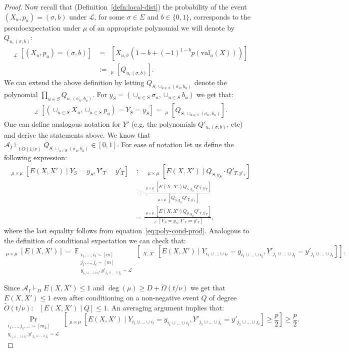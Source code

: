 \documentclass[11pt]{article}
\DeclareMathOperator*{\E}{\mathbb{E}}
\DeclareMathOperator*{\pE}{\widetilde{\mathbb{E}}}
\DeclareMathOperator*{\pPr}{\widetilde{\Pr}}
\def \cA {\mathcal{A}}
\def \cL {\mathcal{L}}
\def \tO {\widetilde{O}}
\def \val {\mathrm{val}}
\theoremstyle{definition}
\begin{document}
\begin{proof}
Now recall that (Definition~\ref{defn:local-dist}) the probability of the event $(X_u,p_u) =  (\sigma,b)$ under $\cL$, for some $\sigma \in \Sigma$ and $b \in \{0,1\}$, corresponds to the pseudoexpectation under $\mu$ of an appropriate polynomial we will denote by $Q_{u,(\sigma,b)}$:
\begin{align}\label{eq:poly-cond}
\pPr_{\cL}[(X_u, p_u) = (\sigma, b)] &= \pE[X_{u,\sigma}(1-b + (-1)^{1-b}p(\val_u(X)))] \nonumber \\
&:= \pE_\mu[Q_{u,(\sigma,b)}].
\end{align}
We can extend the above definition by letting $Q_{S, \cup_{u \in S} (\sigma_u,b_u)}$ denote the polynomial $\prod_{u \in S} Q_{u,(\sigma_u,b_u)}$. For $y_S = (\cup_{u \in S} \sigma_u, \cup_{u \in S} b_u)$ we get that:
\begin{align}\label{eq:poly-cond-prod}
\pPr_{\cL}[(\cup_{u \in S} X_u, \cup_{u \in S} p_u) = Y_S = y_S] = \pE_\mu[Q_{S,\cup_{u \in S}(\sigma_u,b_u)}].
\end{align}
One can define analogous notation for $Y'$ (e.g. the polynomials $Q'_{u,(\sigma,b)}$, etc) and derive the statements above. We know that $\cA_I \vdash_{t~\tO(1/\nu)} Q_{S, \cup_{u \in S} (\sigma_u,b_u)} \in [0,1]$. For ease of notation let us define the following expression:
\begin{align*}
\pE_{\mu \times \mu}[E(X,X') \mid Y_S = y_S, Y'_T = y'_T] &:= \pE_{\mu \times \mu}[E(X,X') \mid  Q_{S, y_S} \cdot  Q'_{T, y'_T}] \\
&= \frac{\pE_{\mu \times \mu}[E(X,X')Q_{S, y_S} Q'_{T, y'_T}]}{\pE_{\mu \times \mu}[Q_{S, y_S} Q'_{T, y'_T}]} \\
&= \frac{\pE_{\mu \times \mu}[E(X,X')Q_{S, y_S} Q'_{T, y'_T}]}{\pPr_{\cL}[Y_{S} = y_{S}, Y'_{T} = y'_{T}]},
\end{align*}
where the last equality follows from equation~\eqref{eq:poly-cond-prod}. Analogous to the definition of conditional expectation we can check that:
\[\pE_{\mu \times \mu}[E(X,X')] = \E_{\substack{i_1,\ldots,i_t \sim [m] \\ j_1,\ldots,j_t \sim [m] \\ y_{i_1 \cup \ldots \cup i_t}, y'_{j_1 \cup \ldots \cup j_t} \sim \cL}}[\pE_{X,X'}[E(X,X') \mid Y_{i_1 \cup \ldots \cup i_t} = y_{i_1 \cup \ldots \cup i_t}, Y'_{j_1 \cup \ldots \cup j_t} = y'_{j_1 \cup \ldots \cup j_t}]].\]

Since $\cA_I \vdash_D E(X,X') \leq 1$ and $\deg(\mu) \geq D + \widetilde{\Omega}(t/\nu)$ we get that $E(X,X') \leq 1$ even after conditioning on a non-negative event $Q$ of degree $\widetilde{O}(t/\nu)$: $\pE[E(X,X') \mid Q] \leq 1$. An averaging argument implies that:
\begin{equation}\label{eq:avg3}
\Pr_{\substack{i_1,\ldots, j_1,\ldots \sim [m_2] \\ y_{i_1 \cup \ldots \cup i_t},y'_{j_1 \cup \ldots \cup j_t} \sim \cL}}\left[\pE_{\mu \times \mu}[E(X,X') \mid Y_{i_1 \cup \ldots \cup i_t} = y_{i_1 \cup \ldots \cup i_t}, Y'_{j_1 \cup \ldots \cup j_t} = y'_{j_1 \cup \ldots \cup j_t}] \geq \frac{p}{2}\right] \geq \frac{p}{2}.
\end{equation}


\end{proof}
\end{document}
